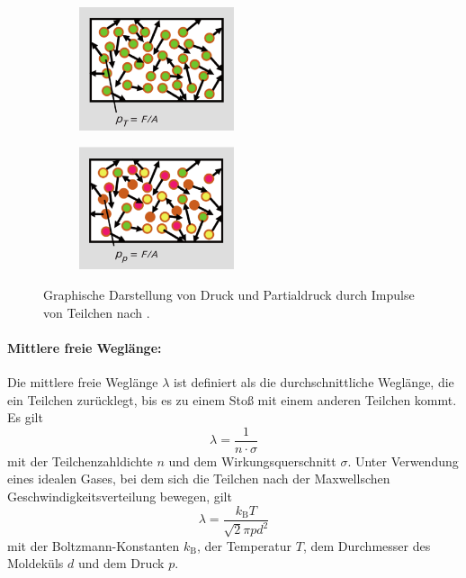 \begin{figure}
  \centering
  \begin{subfigure}[b]{0.49\textwidth}
    \centering
    \includegraphics[width=0.5\textwidth]{Druck.png}
  \end{subfigure}
  \begin{subfigure}[b]{0.49\textwidth}
    \centering
    \includegraphics[width=0.5\textwidth]{Partialdruck.png}
  \end{subfigure}
  \caption{Graphische Darstellung von Druck und Partialdruck durch Impulse von Teilchen nach \cite{pfeiffer}.}
  \label{fig:Druck}
\end{figure}

\paragraph{Mittlere freie Weglänge:}
Die mittlere freie Weglänge $\lambda$ ist definiert als die durchschnittliche Weglänge, die
ein Teilchen zurücklegt, bis es zu einem Stoß mit einem anderen Teilchen kommt. Es gilt
\begin{equation}
  \lambda = \frac{1}{n\cdot\sigma}
  \label{eqn:Weglaenge}
\end{equation}
mit der Teilchenzahldichte $n$ und dem Wirkungsquerschnitt $\sigma$.
Unter Verwendung eines idealen Gases, bei dem sich die Teilchen nach der Maxwellschen Geschwindigkeitsverteilung
bewegen, gilt
\begin{equation}
  \lambda = \frac{k_\text{B}T}{\sqrt{2}\pi p d^2}
\end{equation}
mit der Boltzmann-Konstanten $k_\text{B}$, der Temperatur $T$,
dem Durchmesser des Moldeküls $d$ und dem Druck $p$.
